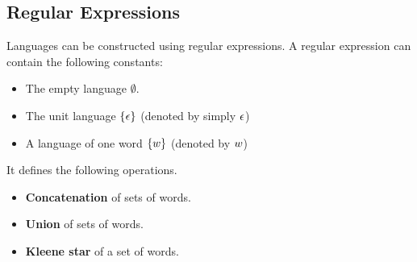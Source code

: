 \subsection{Regular Expressions}

Languages can be constructed using regular expressions. A regular expression can contain the following constants:
\begin{itemize}
	\item The empty language $\emptyset$.
	\item The unit language $\{\epsilon\}$ (denoted by simply $\epsilon$)
	\item A language of one word $\{w\}$ (denoted by $w$)
\end{itemize}

It defines the following operations.
\begin{itemize}
	\item \textbf{Concatenation} of sets of words.
	\item \textbf{Union} of sets of words.
	\item \textbf{Kleene star} of a set of words.
\end{itemize}


